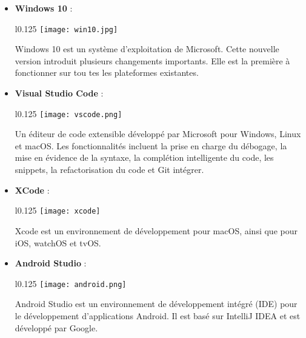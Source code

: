 \begin{itemize}
  \item \textbf{Windows 10} :\\
  \begin{minipage}{\linewidth}
    \begin{wrapfigure}{l}{0.125\textwidth}
      \vspace{-0.5cm}
      \texttt{[image: win10.jpg]} 
    \end{wrapfigure}
    Windows 10 est un système d'exploitation de Microsoft. Cette nouvelle
version introduit plusieurs changements importants. Elle est la
première à fonctionner sur tou
tes les plateformes existantes.
    \end{minipage}

    \vspace{0.5cm}

  \item \textbf{Visual Studio Code} :\\
  \begin{minipage}{\linewidth}
    \begin{wrapfigure}{l}{0.125\textwidth}
      \vspace{-0.5cm}
      \texttt{[image: vscode.png]} 
    \end{wrapfigure}
    Un éditeur de code extensible développé par Microsoft pour Windows, Linux et macOS. Les fonctionnalités incluent
     la prise en charge du débogage, la mise en évidence de la syntaxe, la complétion intelligente du code, les snippets, la refactorisation du code et Git intégrer.
  \end{minipage}
    
  \item \textbf{XCode} :\\
  \begin{minipage}{\linewidth}
    \begin{wrapfigure}{l}{0.125\textwidth}
      \vspace{-0.5cm}
      \texttt{[image: xcode]} 
    \end{wrapfigure}
    Xcode est un environnement de développement pour macOS, ainsi que pour iOS, watchOS et tvOS. 
    \end{minipage}

    \vspace{0.5cm}
    \item \textbf{Android Studio} :\\
    \begin{minipage}{\linewidth}
      \begin{wrapfigure}{l}{0.125\textwidth}
        \vspace{-0.5cm}
        \texttt{[image: android.png]} 
      \end{wrapfigure}
      Android Studio est un environnement de développement intégré (IDE) pour le développement d'applications Android. Il est basé sur IntelliJ IDEA et est développé par Google.
    \end{minipage}


\end{itemize}
